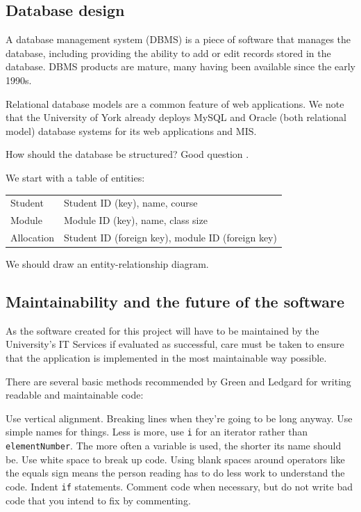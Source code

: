 \documentclass[]{scrartcl}
\begin{document}
\subsection{Database design}

A database management system (DBMS) is a piece of software that manages the database, including providing the ability to add or edit records stored in the database. DBMS products are mature, many having been available since the early 1990s.

Relational database models are a common feature of web applications. We note that the University of York already deploys MySQL and Oracle (both relational model) database systems for its web applications and MIS.

How should the database be structured? Good question \cite{DatabaseModelsLanguagesDesign}.

We start with a table of entities:

\begin{tabular}{ l l }
  Student    & Student ID (key), name, course \\
  Module     & Module ID (key), name, class size \\
  Allocation & Student ID (foreign key), module ID (foreign key) \\
\end{tabular}

We should draw an entity-relationship diagram.

\subsection{Maintainability and the future of the software}

As the software created for this project will have to be maintained by the University's IT Services if evaluated as successful, care must be taken to ensure that the application is implemented in the most maintainable way possible.

There are several basic methods recommended by Green and Ledgard \cite{Green:2011:CGF:2063166.2063168} for writing readable and maintainable code:

Use vertical alignment. Breaking lines when they're going to be long anyway. Use simple names for things. Less is more, use \texttt{i} for an iterator rather than \texttt{elementNumber}. The more often a variable is used, the shorter its name should be. Use white space to break up code. Using blank spaces around operators like the equals sign means the person reading has to do less work to understand the code. Indent \texttt{if} statements. Comment code when necessary, but do not write bad code that you intend to fix by commenting.
\end{document}
